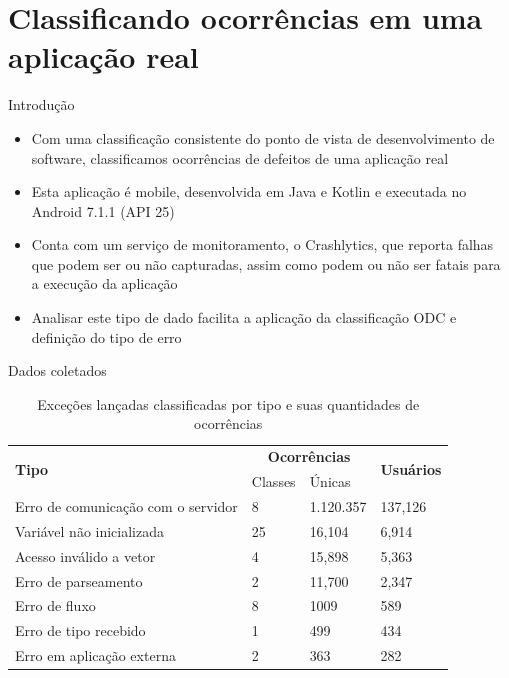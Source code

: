 \documentclass[brazilian]{beamer}
\begin{document}
\section{Classificando ocorrências em uma aplicação real}

\begin{frame}{Introdução}
    \begin{itemize}
        \item Com uma classificação consistente do ponto de vista de desenvolvimento de software, classificamos ocorrências de defeitos de uma aplicação real
        \item Esta aplicação é mobile, desenvolvida em Java e Kotlin e executada no Android 7.1.1 (API 25)
        \item Conta com um serviço de monitoramento, o Crashlytics, que reporta falhas que podem ser ou não capturadas, assim como podem ou não ser fatais para a execução da aplicação
        \item Analisar este tipo de dado facilita a aplicação da classificação ODC e definição do tipo de erro
    \end{itemize}
\end{frame}

\begin{frame}{Dados coletados}
    \begin{table}[H]
        \centering
        \begin{tabularx}{\textwidth}{ l|X|l|l }
            \multirow{2}{*}{\textbf{Tipo}} & \multicolumn{2}{c|}{\textbf{Ocorrências}} & \multirow{2}{*}{\textbf{Usuários}} \\
            & Classes & Únicas & \\
            \hline
            Erro de comunicação com o servidor & 8 & 1.120.357 & 137,126 \\
            Variável não inicializada & 25 & 16,104 & 6,914 \\
            Acesso inválido a vetor & 4 & 15,898 & 5,363 \\
            Erro de parseamento & 2 & 11,700 & 2,347 \\
            Erro de fluxo & 8 & 1009 & 589 \\
            Erro de tipo recebido & 1 & 499 & 434 \\
            Erro em aplicação externa & 2 & 363 & 282 \
        \end{tabularx}
        \caption{Exceções lançadas classificadas por tipo e suas quantidades de ocorrências}
        \label{table:exceptions_classification_1}
    \end{table}
\end{frame}
\end{document}
